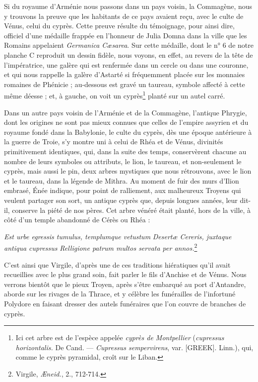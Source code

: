 \documentclass[a4paper, 11pt, oneside, polutonikogreek, french]{article}
\begin{document}
Si du royaume d'Arménie nous passons dans un pays voisin, la Commagène, nous y trouvons la preuve que les habitants de ce pays avaient reçu, avec le culte de Vénus, celui du cyprès. Cette preuve résulte du témoignage, pour ainsi dire, officiel d'une médaille frappée en l'honneur de Julia Domna dans la ville que les Romains appelaient \emph{Germanica Cæsarea}. Sur cette médaille, dont le n° 6 de notre planche C reproduit un dessin fidèle, nous voyons, en effet, au revers de la tête de l'impératrice, une galère qui est renfermée dans un cercle ou dans une couronne, et qui nous rappelle la galère d'Astarté si fréquemment placée sur les monnaies romaines de Phénicie ; au-dessous est gravé un taureau, symbole affecté à cette même déesse ; et, à gauche, on voit un cyprès\footnote{Ici cet arbre est de l'espèce appelée \emph{cyprès de Montpellier} (\emph{cupressus horizontalis.} De Cand. --- \emph{Cupressus sempervirens}, var. [GREEK]. Linn.), qui, comme le cyprès pyramidal, croît sur le Liban.} planté sur un autel carré.

Dans un autre pays voisin de l'Arménie et de la Commagène, l'antique Phrygie, dont les origines ne sont pas mieux connues que celles de l'empire assyrien et du royaume fondé dans la Babylonie, le culte du cyprès, dès une époque antérieure à la guerre de Troie, s'y montre uni à celui de Rhéa et de Vénus, divinités primitivement identiques, qui, dans la suite des temps, conservèrent chacune au nombre de leurs symboles ou attributs, le lion, le taureau, et non-seulement le cyprès, mais aussi le pin, deux arbres mystiques que nous rétrouvons, avec le lion et le taureau, dans la légende de Mithra. Au moment de fuir des murs d'Ilion embrasé, Énée indique, pour point de ralliement, aux malheureux Troyens qui veulent partager son sort, un antique cyprès que, depuis longues années, leur dit-il, conserve la piété de nos pères. Cet arbre vénéré était planté, hors de la ville, à côté d'un temple abandonné de Cérès ou Rhéa :

\emph{Est urbe egressis tumulus, templumque vetustum}  
\emph{Desertæ Cereris, juxtaque antiqua cupressus}  
\emph{Relligione patrum multos servata per annos.}\footnote{Virgile, \emph{Æneid.}, 2., 712-714.}

C'est ainsi que Virgile, d'après une de ces traditions hiératiques qu'il avait recueillies avec le plus grand soin, fait parler le fils d'Anchise et de Vénus. Nous verrons bientôt que le pieux Troyen, après s'être embarqué au port d'Antandre, aborde sur les rivages de la Thrace, et y célèbre les funérailles de l'infortuné Polydore en faisant dresser des autels funéraires que l'on couvre de branches de cyprès.
\end{document}
